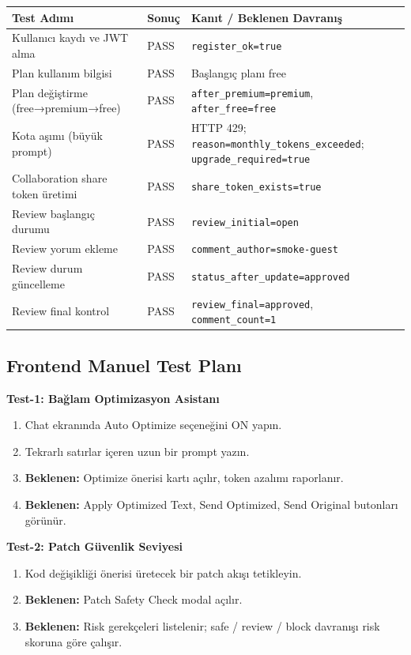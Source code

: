 \documentclass[11pt,a4paper]{article}
\begin{document}
\begin{tabularx}{\textwidth}{@{} L{3.5cm} C{1.5cm} X @{}}
\toprule
\textbf{Test Adımı} & \textbf{Sonuç} & \textbf{Kanıt / Beklenen Davranış} \\
\midrule
Kullanıcı kaydı ve JWT alma & PASS & \texttt{register\_ok=true} \\
\addlinespace
Plan kullanım bilgisi & PASS & Başlangıç planı free \\
\addlinespace
Plan değiştirme (free→premium→free) & PASS & \texttt{after\_premium=premium}, \texttt{after\_free=free} \\
\addlinespace
Kota aşımı (büyük prompt) & PASS & HTTP 429; \texttt{reason=monthly\_tokens\_exceeded}; \texttt{upgrade\_required=true} \\
\addlinespace
Collaboration share token üretimi & PASS & \texttt{share\_token\_exists=true} \\
\addlinespace
Review başlangıç durumu & PASS & \texttt{review\_initial=open} \\
\addlinespace
Review yorum ekleme & PASS & \texttt{comment\_author=smoke-guest} \\
\addlinespace
Review durum güncelleme & PASS & \texttt{status\_after\_update=approved} \\
\addlinespace
Review final kontrol & PASS & \texttt{review\_final=approved}, \texttt{comment\_count=1} \\
\bottomrule
\end{tabularx}

\subsection{Frontend Manuel Test Planı}

\textbf{Test-1: Bağlam Optimizasyon Asistanı}
\begin{enumerate}[leftmargin=1.5em]
  \item Chat ekranında Auto Optimize seçeneğini ON yapın.
  \item Tekrarlı satırlar içeren uzun bir prompt yazın.
  \item \textbf{Beklenen:} Optimize önerisi kartı açılır, token azalımı raporlanır.
  \item \textbf{Beklenen:} Apply Optimized Text, Send Optimized, Send Original butonları görünür.
\end{enumerate}

\textbf{Test-2: Patch Güvenlik Seviyesi}
\begin{enumerate}[leftmargin=1.5em]
  \item Kod değişikliği önerisi üretecek bir patch akışı tetikleyin.
  \item \textbf{Beklenen:} Patch Safety Check modal açılır.
  \item \textbf{Beklenen:} Risk gerekçeleri listelenir; safe / review / block davranışı risk skoruna göre çalışır.
\end{enumerate}
\end{document}
